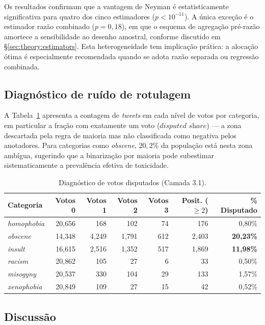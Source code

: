 Os resultados confirmam que a vantagem de Neyman é estatisticamente
significativa para quatro dos cinco estimadores ($p < 10^{-11}$). A única
exceção é o estimador razão combinado ($p=0{,}18$), em que o esquema de
agregação pré-razão amortece a sensibilidade ao desenho amostral, conforme
discutido em \S\ref{sec:theory:estimators}. Esta heterogeneidade tem
implicação prática: a alocação ótima é especialmente recomendada quando se
adota razão separada ou regressão combinada.

\subsection{Diagnóstico de ruído de rotulagem}

A Tabela~\ref{tab:noise} apresenta a contagem de \textit{tweets} em cada nível
de votos por categoria, em particular a fração com exatamente um voto
($\textit{disputed share}$) --- a zona descartada pela regra de maioria mas
não classificada como negativa pelos anotadores. Para
categorias como \textit{obscene}, $20{,}2\%$ da população está nesta zona
ambígua, sugerindo que a binarização por maioria pode subestimar
sistematicamente a prevalência efetiva de toxicidade.

\begin{table}[!t]
\centering
\small
\setlength{\tabcolsep}{8pt}
\caption{Diagnóstico de votos disputados (Camada 3.1).}
\label{tab:noise}
\begin{tabular}{lrrrrrr}
\toprule
Categoria & Votos 0 & Votos 1 & Votos 2 & Votos 3 & Posit. ($\geq 2$) & \% Disputado \\
\midrule
\textit{homophobia} & 20{,}656 & 168 & 102 & 74 & 176 & 0{,}80\% \\
\textit{obscene}    & 14{,}348 & 4{,}249 & 1{,}791 & 612 & 2{,}403 & \textbf{20{,}23\%} \\
\textit{insult}     & 16{,}615 & 2{,}516 & 1{,}352 & 517 & 1{,}869 & \textbf{11{,}98\%} \\
\textit{racism}     & 20{,}862 & 105 & 27 & 6 & 33 & 0{,}50\% \\
\textit{misogyny}   & 20{,}537 & 330 & 104 & 29 & 133 & 1{,}57\% \\
\textit{xenophobia} & 20{,}849 & 109 & 27 & 15 & 42 & 0{,}52\% \\
\bottomrule
\end{tabular}
\end{table}

\subsection{Discussão}

